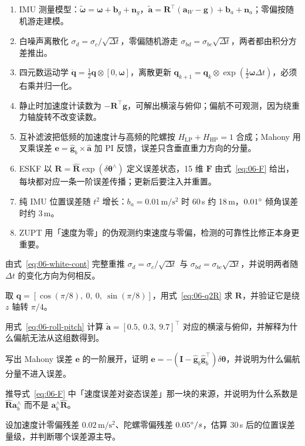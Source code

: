 \begin{summary}

\begin{enumerate}
  \item IMU 测量模型：$\tilde{\bm{\omega}}=\bm{\omega}+\bm{b}_g+\bm{n}_g$，$\tilde{\bm{a}}=\bm{R}^{\top}(\bm{a}_W-\bm{g})+\bm{b}_a+\bm{n}_a$；零偏按随机游走建模。
  \item 白噪声离散化 $\sigma_d=\sigma_c/\sqrt{\Delta t}$，零偏随机游走 $\sigma_{bd}=\sigma_{bc}\sqrt{\Delta t}$，两者都由积分方差推出。
  \item 四元数运动学 $\dot{\bm{q}}=\tfrac12\bm{q}\otimes[0,\bm{\omega}]$，离散更新 $\bm{q}_{k+1}=\bm{q}_k\otimes\exp(\tfrac12\bm{\omega}\Delta t)$，必须右乘并归一化。
  \item 静止时加速度计读数为 $-\bm{R}^{\top}\bm{g}$，可解出横滚与俯仰；偏航不可观测，因为绕重力轴旋转不改变读数。
  \item 互补滤波把低频的加速度计与高频的陀螺按 $H_{\text{LP}}+H_{\text{HP}}=1$ 合成；Mahony 用叉乘误差 $\bm{e}=\hat{\bm{g}}_b\times\hat{\bm{a}}$ 加 PI 反馈，误差只含垂直重力方向的分量。
  \item ESKF 以 $\bm{R}=\hat{\bm{R}}\exp(\delta\bm{\theta}^{\wedge})$ 定义误差状态，15 维 $\bm{F}$ 由式~\eqref{eq:06-F} 给出，每块都对应一条一阶误差传播；更新后要注入并重置。
  \item 纯 IMU 位置误差随 $t^{2}$ 增长：$b_a=0.01\,\mathrm{m/s^2}$ 时 60\,s 约 18\,m，$0.01^\circ$ 倾角误差时约 3\,m。
  \item ZUPT 用「速度为零」的伪观测约束速度与零偏，检测的可靠性比修正本身更重要。
\end{enumerate}


\end{summary}

\begin{problemset}

  \item 由式~\eqref{eq:06-white-cont} 完整重推 $\sigma_d=\sigma_c/\sqrt{\Delta t}$ 与 $\sigma_{bd}=\sigma_{bc}\sqrt{\Delta t}$，并说明两者随 $\Delta t$ 的变化方向为何相反。
  \item 取 $\bm{q}=[\cos(\pi/8),\ 0,\ 0,\ \sin(\pi/8)]$，用式~\eqref{eq:06-q2R} 求 $\bm{R}$，并验证它是绕 $z$ 轴转 $\pi/4$。
  \item 用式~\eqref{eq:06-roll-pitch} 计算 $\tilde{\bm{a}}=[0.5,\ 0.3,\ 9.7]^{\top}$ 对应的横滚与俯仰，并解释为什么偏航无法从这组数得到。
  \item 写出 Mahony 误差 $\bm{e}$ 的一阶展开，证明 $\bm{e}=-(\bm{I}-\hat{\bm{g}}_b\hat{\bm{g}}_b^{\top})\delta\bm{\theta}$，并说明为什么偏航分量不进入误差。
  \item 推导式~\eqref{eq:06-F} 中「速度误差对姿态误差」那一块的来源，并说明为什么系数是 $\hat{\bm{R}}\bm{a}_b^{\wedge}$ 而不是 $\bm{a}_b^{\wedge}\hat{\bm{R}}$。
  \item 设加速度计零偏残差 $0.02\,\mathrm{m/s^2}$、陀螺零偏残差 $0.05^\circ/s$，估算 30\,s 后的位置误差量级，并判断哪个误差源主导。
\end{problemset}

